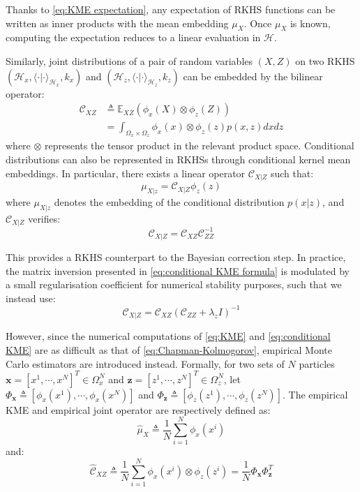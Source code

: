 \documentclass[conference]{IEEEtran}
\begin{document}
Thanks to \eqref{eq:KME expectation}, any expectation of RKHS functions can be written as inner products with the mean embedding $\mu_X$. Once $\mu_X$ is known, computing the expectation reduces to a linear evaluation in $\mathcal{H}$. 

Similarly, joint distributions of a pair of random variables $(X,Z)$ on two RKHS $(\mathcal{H}_x,\langle\cdot|\cdot\rangle_{\mathcal{H}_x},k_x)$ and $(\mathcal{H}_z,\langle\cdot|\cdot\rangle_{\mathcal{H}_z},k_z)$ can be embedded by the bilinear operator:
\begin{equation}
\begin{aligned}
\mathcal{C}_{XZ}&\triangleq\mathbb{E}_{XZ}(\phi_x(X)\otimes\phi_z(Z))\\
&=\int_{\Omega_x\times\Omega_z}{\phi_x(x)\otimes\phi_z(z)p(x,z)dxdz}
\end{aligned}\label{eq:conditional KME}
\end{equation}
where $\otimes$ represents the tensor product in the relevant product space. Conditional distributions can also be represented in RKHSs through conditional kernel mean embeddings. In particular, there exists a linear operator $\mathcal{C}_{X|Z}$ such that:
\begin{equation}
\mu_{X|z}=\mathcal{C}_{X|Z}\phi_z(z)
\end{equation}
where $\mu_{X|z}$ denotes the embedding of the conditional distribution $p(x|z)$, and $\mathcal{C}_{X|Z}$ verifies:
\begin{equation}
\mathcal{C}_{X|Z}=\mathcal{C}_{XZ}\mathcal{C}_{ZZ}^{-1}\label{eq:conditional KME formula}
\end{equation}

This provides a RKHS counterpart to the Bayesian correction step. In practice, the matrix inversion presented in \eqref{eq:conditional KME formula} is modulated by a small regularisation coefficient for numerical stability purposes, such that we instead use:
\begin{equation}
\mathcal{C}_{X|Z}=\mathcal{C}_{XZ}(\mathcal{C}_{ZZ}+\lambda_z I)^{-1}
\end{equation}

However, since the numerical computations of \eqref{eq:KME} and \eqref{eq:conditional KME} are as difficult as that of \eqref{eq:Chapman-Kolmogorov}, empirical Monte Carlo estimators are introduced instead. Formally, for two sets of $N$ particles $\textbf{x}=[x^1,\cdots,x^N]^T\in\Omega_x^N$ and $\textbf{z}=[z^1,\cdots,z^N]^T\in\Omega_z^N$, let $\Phi_{\textbf{x}}\triangleq[\phi_x(x^1),\cdots,\phi_x(x^N)]$ and $\Phi_{\textbf{z}}\triangleq[\phi_z(z^1),\cdots,\phi_z(z^N)]$. The empirical KME and empirical joint operator are respectively defined as:
\begin{equation}
\hat{\mu}_X\triangleq\frac{1}{N}\sum_{i=1}^N\phi_x(x^i)
\end{equation}
and:
\begin{equation}
\hat{\mathcal{C}}_{XZ}\triangleq\frac{1}{N}\sum_{i=1}^N\phi_x(x^i)\otimes\phi_z(z^i)=\frac{1}{N}\Phi_{\textbf{x}}\Phi_{\textbf{z}}^T
\end{equation}
\end{document}
